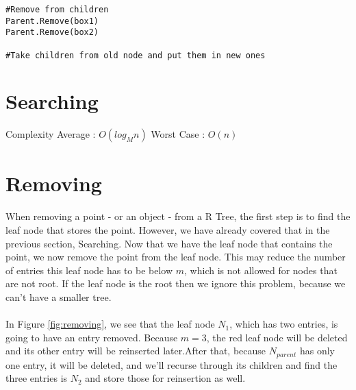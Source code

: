\documentclass{article}
\begin{document}
\begin{multicols}{2}[]
\begin{lstlisting}
#Remove from children
Parent.Remove(box1)
Parent.Remove(box2)

#Take children from old node and put them in new ones
\end{lstlisting}

\section{Searching}
Complexity
Average : $O(log_Mn)$
Worst Case : $O(n)$

\section{Removing}

\paragraph{}
When removing a point - or an object - from a R Tree, the first step is to find the leaf node that stores the point.
However, we have already covered that in the previous section, Searching. Now that we have the leaf node that contains
the point, we now remove the point from the leaf node. This may reduce the number of entries this leaf node has to be below
$m$, which is not allowed for nodes that are not root. If the leaf node is the root then we ignore this problem, because
we can't have a smaller tree.\\

\begin{minipage}{\columnwidth}
\centering
{}
\label{fig:removing}
\end{minipage}

\paragraph{}
In Figure \ref{fig:removing}, we see that the leaf node $N_1$, which has two entries, is going to have an entry removed. Because $m=3$, the red leaf node will be deleted and its other entry will be reinserted later.After that, because $N_{parent}$ has only one entry, it will be deleted, and we'll recurse through its children and find the three entries is $N_2$ and store those for reinsertion as well.

\end{multicols}
\end{document}
